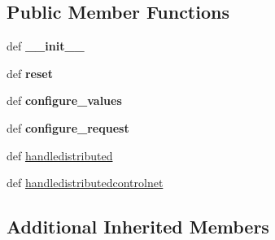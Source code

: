 \subsection*{Public Member Functions}
\begin{DoxyCompactItemize}
\item 
\hypertarget{classcore_1_1session_1_1_session_config_a400aa0b279fe367aafb5e0569a6df4ff}{def {\bfseries \+\_\+\+\_\+init\+\_\+\+\_\+}}\label{classcore_1_1session_1_1_session_config_a400aa0b279fe367aafb5e0569a6df4ff}

\item 
\hypertarget{classcore_1_1session_1_1_session_config_ab5692d0d6ff75f674e8ccc37c24e6548}{def {\bfseries reset}}\label{classcore_1_1session_1_1_session_config_ab5692d0d6ff75f674e8ccc37c24e6548}

\item 
\hypertarget{classcore_1_1session_1_1_session_config_ad63d06536ff560566a9b14ccb7d14b50}{def {\bfseries configure\+\_\+values}}\label{classcore_1_1session_1_1_session_config_ad63d06536ff560566a9b14ccb7d14b50}

\item 
\hypertarget{classcore_1_1session_1_1_session_config_a4dd817bc42a6a51d996726f9d41ddc58}{def {\bfseries configure\+\_\+request}}\label{classcore_1_1session_1_1_session_config_a4dd817bc42a6a51d996726f9d41ddc58}

\item 
def \hyperlink{classcore_1_1session_1_1_session_config_a9540ede9462ac0d8a365cd2b49834307}{handledistributed}
\item 
def \hyperlink{classcore_1_1session_1_1_session_config_a9fe50c3a7c683b494ec863c89e1cf252}{handledistributedcontrolnet}
\end{DoxyCompactItemize}
\subsection*{Additional Inherited Members}


